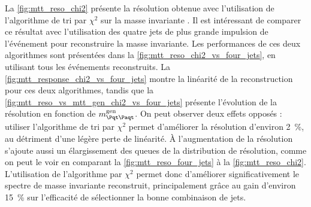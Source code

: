 \bigskip

La \cref{fig:mtt_reso_chi2} présente la résolution obtenue avec l'utilisation de l'algorithme de tri par $\chi^2$ sur la masse invariante \mtt. Il est intéressant de comparer ce résultat avec l'utilisation des quatre jets de plus grande impulsion de l'événement pour reconstruire la masse invariante. Les performances de ces deux algorithmes sont présentées dans la \cref{fig:mtt_reso_chi2_vs_four_jets}, en utilisant tous les événements reconstruits. La \cref{fig:mtt_response_chi2_vs_four_jets} montre la linéarité de la reconstruction pour ces deux algorithmes, tandis que la \cref{fig:mtt_reso_vs_mtt_gen_chi2_vs_four_jets} présente l'évolution de la résolution en fonction de $\mtt^\text{gen}$. On peut observer deux effets opposés : utiliser l'algorithme de tri par $\chi^2$ permet d'améliorer la résolution d'environ \SI{2}{\%}, au détriment d'une légère perte de linéarité. À l'augmentation de la résolution s'ajoute aussi un élargissement des queues de la distribution de résolution, comme on peut le voir en comparant la \cref{fig:mtt_reso_four_jets} à la \cref{fig:mtt_reso_chi2}. L'utilisation de l'algorithme par $\chi^2$ permet donc d'améliorer significativement le spectre de masse invariante reconstruit, principalement grâce au gain d'environ \SI{15}{\percent} sur l'efficacité de sélectionner la bonne combinaison de jets.

